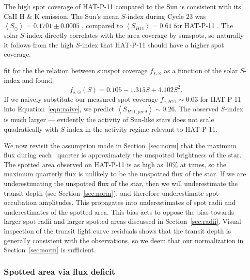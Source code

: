 The high spot coverage of HAT-P-11 compared to the Sun is consistent with its CaII H \& K emission. The Sun's mean $S$-index during Cycle 23 was $\left<S_\odot\right> = 0.1701 \pm 0.0005$ \citep{Egeland2017}, compared to $\left<S_{H11}\right> = 0.61$ for HAT-P-11 \citep{Bakos2010}. The solar $S$-index directly correlates with the area coverage by sunspots, so naturally it follows from the high $S$-index that HAT-P-11 should have a higher spot coverage. 

\citet{Shapiro2014} fit for the the relation between sunspot coverage $f_{s,\odot}$ as a function of the solar $S$-index and found:
\begin{equation}
f_{s,\odot}(S) = 0.105 - 1.315 S + 4.102 S^2. \label{eqn:naive}
\end{equation}
If we naively substitute our measured spot coverage $f_{s,H11} \sim 0.03$ for HAT-P-11 into Equation~\ref{eqn:naive}, we predict $\left<S_{H11, pred}\right> \sim 0.26$. The observed $S$-index is much larger --- evidently the activity of Sun-like stars does not scale quadratically with $S$-index in the activity regime relevant to HAT-P-11.

We now revisit the assumption made in Section~\ref{sec:norm} that the maximum flux during each \kepler\ quarter is approximately the unspotted brightness of the star. The spotted area observed on HAT-P-11 is as high as 10\% at times, so the maximum quarterly flux is unlikely to be the unspotted flux of the star. If we are underestimating the unspotted flux of the star, then we will underestimate the transit depth (see Section~\ref{sec:norm}), and therefore underestimate spot occultation amplitudes. This propagates into underestimates of spot radii and underestimates of the spotted area. This bias acts to oppose the bias towards larger spot radii and larger spotted areas discussed in Section~\ref{sec:radii}. Visual inspection of the transit light curve residuals shows that the transit depth is generally consistent with the observations, so we deem that our normalization in Section~\ref{sec:norm} is sufficient.

\subsubsection{Spotted area via flux deficit}


